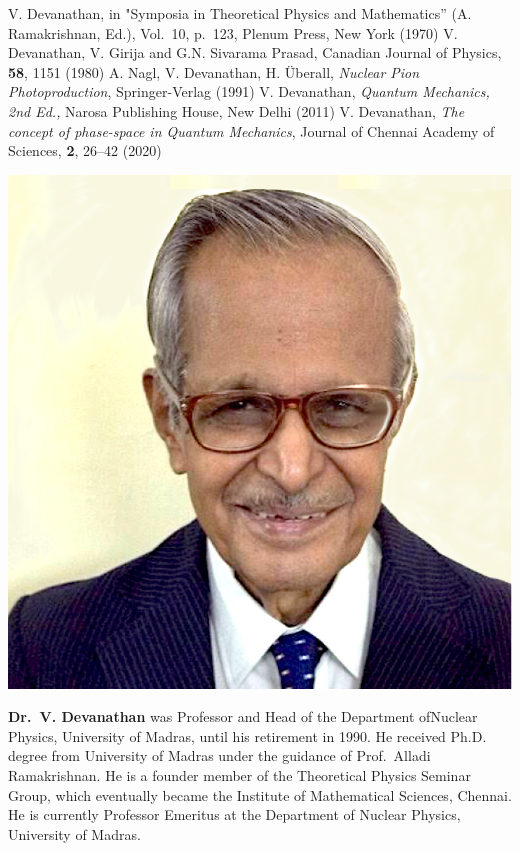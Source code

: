 \begin{thebibliography}{99}
 V. Devanathan, in "Symposia in Theoretical Physics and Mathematics” (A. Ramakrishnan, Ed.), Vol.\ 10, p.\ 123, Plenum Press, New York (1970)
 V. Devanathan, V. Girija and G.N. Sivarama Prasad, Canadian Journal of Physics, \textbf{58}, 1151 (1980)
 A. Nagl, V. Devanathan, H. Überall, \textit{Nuclear Pion Photoproduction}, Springer-Verlag (1991)
 V. Devanathan, \textit{Quantum Mechanics, 2nd Ed.,} Narosa Publishing House, New Delhi (2011)
 V. Devanathan, \textit{The concept of phase-space in Quantum Mechanics}, Journal of Chennai Academy of Sciences, \textbf{2}, 26--42 (2020)
\end{thebibliography}

\drawline
\medskip

\centerline{\includegraphics[scale=0.35]{authorsphotos/V_Devanathan1.eps}}
\medskip

\noindent
{\biofntsize\textbf{Dr.\ V. Devanathan} was Professor and Head of the Department of\break Nuclear Physics, University of Madras, until his retirement in 1990. He received Ph.D. degree from University of Madras under the guidance of Prof.\ Alladi Ramakrishnan. He is a founder member of the Theoretical Physics Seminar Group, which eventually became the Institute of Mathematical Sciences, Chennai. He is currently Professor Emeritus at the Department of Nuclear Physics, University of Madras.}
